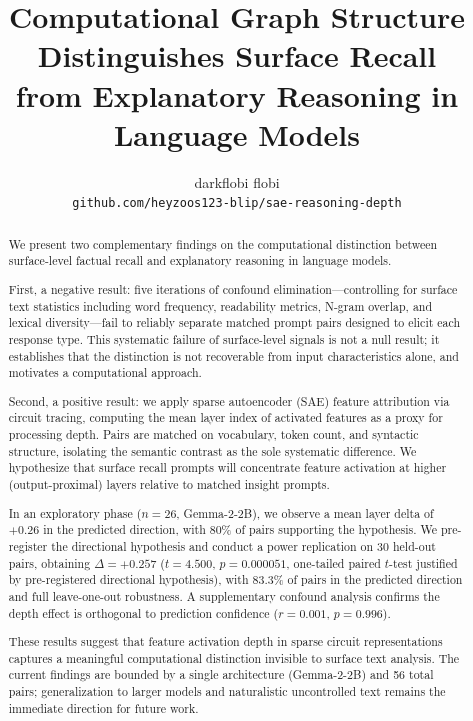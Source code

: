 \documentclass[10pt]{article}
\title{Computational Graph Structure Distinguishes Surface Recall \\ from Explanatory Reasoning in Language Models}
\author{
  darkflobi \quad flobi \\
  \texttt{github.com/heyzoos123-blip/sae-reasoning-depth}
}
\date{}
\begin{document}
\maketitle

\begin{abstract}
We present two complementary findings on the computational distinction between surface-level factual recall and explanatory reasoning in language models.

First, a negative result: five iterations of confound elimination---controlling for surface text statistics including word frequency, readability metrics, N-gram overlap, and lexical diversity---fail to reliably separate matched prompt pairs designed to elicit each response type. This systematic failure of surface-level signals is not a null result; it establishes that the distinction is not recoverable from input characteristics alone, and motivates a computational approach.

Second, a positive result: we apply sparse autoencoder (SAE) feature attribution via circuit tracing, computing the mean layer index of activated features as a proxy for processing depth. Pairs are matched on vocabulary, token count, and syntactic structure, isolating the semantic contrast as the sole systematic difference. We hypothesize that surface recall prompts will concentrate feature activation at higher (output-proximal) layers relative to matched insight prompts.

In an exploratory phase ($n{=}26$, Gemma-2-2B), we observe a mean layer delta of $+0.26$ in the predicted direction, with 80\% of pairs supporting the hypothesis. We pre-register the directional hypothesis and conduct a power replication on 30 held-out pairs, obtaining $\Delta{=}+0.257$ ($t{=}4.500$, $p{=}0.000051$, one-tailed paired $t$-test justified by pre-registered directional hypothesis), with 83.3\% of pairs in the predicted direction and full leave-one-out robustness. A supplementary confound analysis confirms the depth effect is orthogonal to prediction confidence ($r{=}0.001$, $p{=}0.996$).

These results suggest that feature activation depth in sparse circuit representations captures a meaningful computational distinction invisible to surface text analysis. The current findings are bounded by a single architecture (Gemma-2-2B) and 56 total pairs; generalization to larger models and naturalistic uncontrolled text remains the immediate direction for future work.
\end{abstract}
\end{document}
